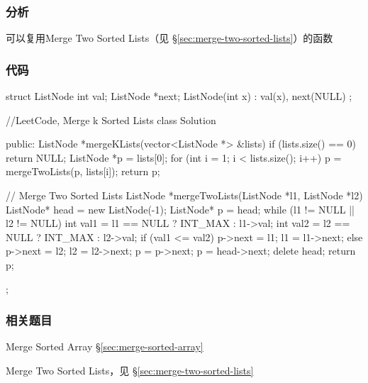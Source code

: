 \subsubsection{分析}
可以复用Merge Two Sorted Lists（见 \S \ref{sec:merge-two-sorted-lists}）的函数


\subsubsection{代码}
\begin{Code}
struct ListNode {
    int val;
    ListNode *next;
    ListNode(int x) :
            val(x), next(NULL) {
    }
};
 
//LeetCode, Merge k Sorted Lists
class Solution {
public:
    ListNode *mergeKLists(vector<ListNode *> &lists) {
        if (lists.size() == 0)
            return NULL;
        ListNode *p = lists[0];
        for (int i = 1; i < lists.size(); i++) {
            p = mergeTwoLists(p, lists[i]);
        }
        return p;
    }
 
    // Merge Two Sorted Lists
    ListNode *mergeTwoLists(ListNode *l1, ListNode *l2) {
        ListNode* head = new ListNode(-1);
        ListNode* p = head;
        while (l1 != NULL || l2 != NULL) {
            int val1 = l1 == NULL ? INT_MAX : l1->val;
            int val2 = l2 == NULL ? INT_MAX : l2->val;
            if (val1 <= val2) {
                p->next = l1;
                l1 = l1->next;
            } else {
                p->next = l2;
                l2 = l2->next;
            }
            p = p->next;
        }
        p = head->next;
        delete head;
        return p;
    }
};
\end{Code}


\subsubsection{相关题目}
\begindot
\item Merge Sorted Array \S \ref{sec:merge-sorted-array}
\item Merge Two Sorted Lists，见 \S \ref{sec:merge-two-sorted-lists}
\myenddot
